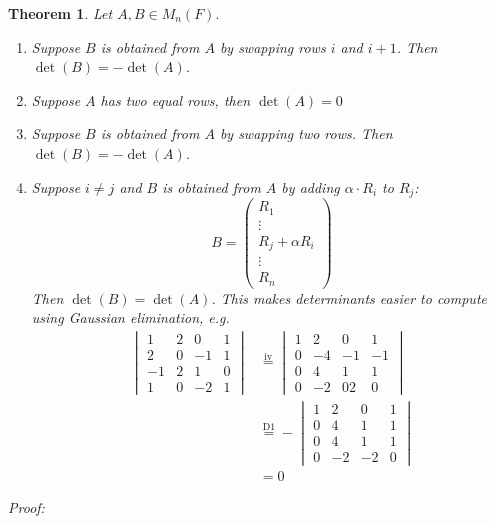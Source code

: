 \documentclass{report}
\newtheorem{theorem}{Theorem}[subsection]
\theoremstyle{remark}
\theoremstyle{definition}
\theoremstyle{definition}
\theoremstyle{theorem}
\begin{document}
\begin{theorem}
Let $A,B \in M_n(F).$ 
\begin{enumerate}[label=\roman*]
    \item Suppose $B$ is obtained from $A$ by swapping rows $i$ and $i+1$. Then $\det(B)=-\det(A)$.
    \item Suppose $A$ has two equal rows, then $\det(A)=0$
    \item Suppose $B$ is obtained from $A$ by swapping two rows. Then $\det(B)=-\det(A)$.
    \item Suppose $ i \neq j$ and $B$ is obtained from $A$ by adding $\alpha \cdot R_i$ to $R_j$:
    \[B = \begin{pmatrix}
    R_1\\
    \vdots\\
    R_j+\alpha R_i\\
    \vdots\\
    R_n
    \end{pmatrix}\]
    Then $\det(B) = \det(A)$. This makes determinants easier to compute using Gaussian elimination, e.g.
    \begin{align*}
        \begin{vmatrix}
        1&2&0&1\\
        2&0&-1&1\\
        -1&2&1&0\\
        1&0&-2&1
        \end{vmatrix} &\stackrel{\text{iv}}{=} \begin{vmatrix}
        1&2&0&1\\
        0&-4&-1&-1\\
        0&4&1&1\\
        0&-2&02&0
        \end{vmatrix}\\
        &\stackrel{\text{D1}}{=} -\begin{vmatrix}
        1&2&0&1\\
        0&4&1&1\\
        0&4&1&1\\
        0&-2&-2&0
        \end{vmatrix}\\
        &=0
    \end{align*}
\end{enumerate}
\end{theorem}
\emph{Proof:}
\end{document}
